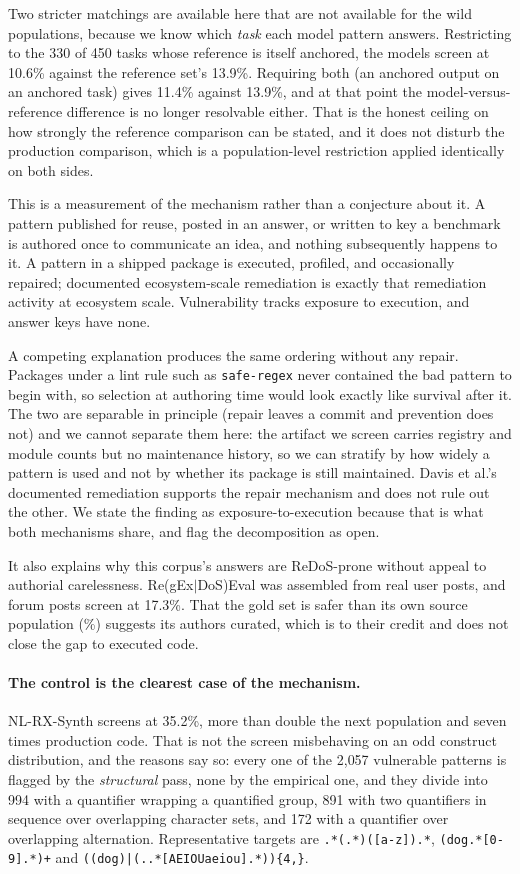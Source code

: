 \documentclass[11pt]{article}
\begin{document}
Two stricter matchings are available here that are not available for the wild
populations, because we know which \emph{task} each model pattern answers.
Restricting to the 330 of 450 tasks whose reference is itself anchored, the
models screen at 10.6\% against the reference set's 13.9\%. Requiring both (an
anchored output on an anchored task) gives 11.4\% against 13.9\%, and at
that point the model-versus-reference difference is no longer resolvable
either. That is the honest ceiling on how strongly the reference comparison
can be stated, and it does not disturb the production comparison, which is a
population-level restriction applied identically on both sides.

This is a measurement of the mechanism rather than a conjecture about it. A
pattern published for reuse, posted in an answer, or written to key a
benchmark is authored once to communicate an idea, and nothing subsequently
happens to it. A pattern in a shipped package is executed, profiled, and
occasionally repaired; documented ecosystem-scale remediation is exactly that
remediation activity at ecosystem scale. Vulnerability tracks exposure to
execution, and answer keys have none.

A competing explanation produces the same ordering without any repair.
Packages under a lint rule such as \texttt{safe-regex} never contained the bad
pattern to begin with, so selection at authoring time would look exactly like
survival after it. The two are separable in principle (repair leaves a
commit and prevention does not) and we cannot separate them here: the
artifact we screen carries registry and module counts but no maintenance
history, so we can stratify by how widely a pattern is used and not by whether
its package is still maintained. Davis et al.'s documented remediation
supports the repair mechanism and does not rule out the other. We state the
finding as exposure-to-execution because that is what both mechanisms share,
and flag the decomposition as open.

It also explains why this corpus's answers are ReDoS-prone without appeal to
authorial carelessness. Re(gEx$|$DoS)Eval was assembled from real user posts,
and forum posts screen at 17.3\%. That the gold set is safer than its own
source population (\anchoredgold{}\%) suggests its authors curated, which is to their
credit and does not close the gap to executed code.

\paragraph{The control is the clearest case of the mechanism.} NL-RX-Synth
screens at 35.2\%, more than double the next population and seven times
production code. That is not the screen misbehaving on an odd construct
distribution, and the reasons say so: every one of the 2{,}057 vulnerable
patterns is flagged by the \emph{structural} pass, none by the empirical one,
and they divide into 994 with a quantifier wrapping a quantified group, 891
with two quantifiers in sequence over overlapping character sets, and 172 with
a quantifier over overlapping alternation. Representative targets are
\lstinline!.*(.*)([a-z]).*!, \lstinline!(dog.*[0-9].*)+! and
\lstinline!((dog)|(..*[AEIOUaeiou].*)){4,}!.
\end{document}
